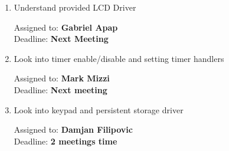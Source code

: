 \documentclass[11pt,a4paper]{scrartcl}
\begin{document}
\begin{enumerate}

\item Understand provided LCD Driver
\begin{flushright}
Assigned to: \textbf{Gabriel Apap} \\
Deadline: \textbf{Next Meeting}
\end{flushright}

\item Look into timer enable/disable and setting timer handlers
\begin{flushright}
Assigned to: \textbf{Mark Mizzi} \\
Deadline: \textbf{Next meeting}
\end{flushright}

\item Look into keypad and persistent storage driver
\begin{flushright}
Assigned to: \textbf{Damjan Filipovic} \\
Deadline: \textbf{2 meetings time}
\end{flushright}


\end{enumerate}
\end{document}
